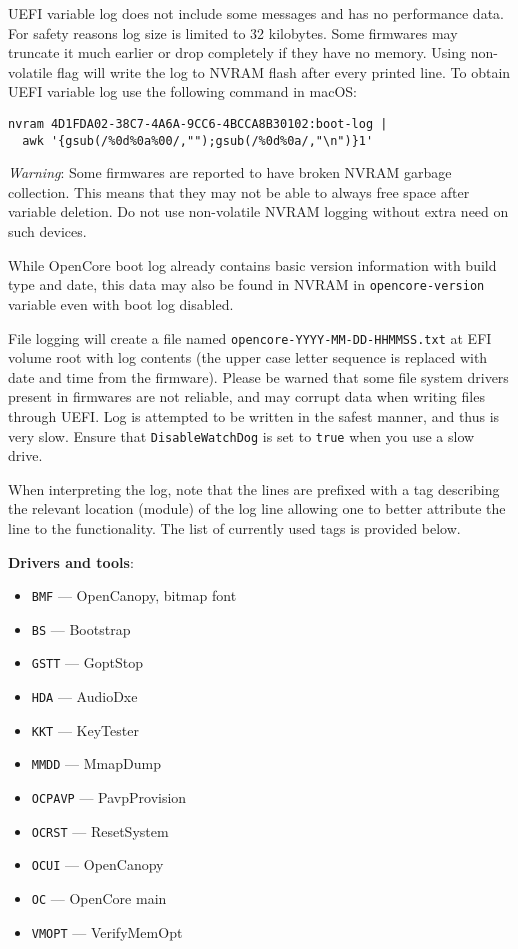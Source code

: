 \documentclass[]{article}
\providecommand{\tightlist}{%
  \setlength{\itemsep}{0pt}\setlength{\parskip}{0pt}}
\begin{document}
\begin{enumerate}
  UEFI variable log does not include some messages and has no performance data. For safety
  reasons log size is limited to 32 kilobytes. Some firmwares may truncate it much earlier
  or drop completely if they have no memory. Using non-volatile flag will write the log to
  NVRAM flash after every printed line. To obtain UEFI variable log use the following command
  in macOS:
\begin{lstlisting}[label=nvramlog, style=ocbash]
nvram 4D1FDA02-38C7-4A6A-9CC6-4BCCA8B30102:boot-log |
  awk '{gsub(/%0d%0a%00/,"");gsub(/%0d%0a/,"\n")}1'
\end{lstlisting}

  \emph{Warning}: Some firmwares are reported to have broken NVRAM garbage collection.
  This means that they may not be able to always free space after variable deletion.
  Do not use non-volatile NVRAM logging without extra need on such devices.

  While OpenCore boot log already contains basic version information with build type and
  date, this data may also be found in NVRAM in \texttt{opencore-version} variable
  even with boot log disabled.

  File logging will create a file named \texttt{opencore-YYYY-MM-DD-HHMMSS.txt} at EFI
  volume root with log contents (the upper case letter sequence is replaced with date
  and time from the firmware). Please be warned that some file system drivers present
  in firmwares are not reliable, and may corrupt data when writing files through UEFI.
  Log is attempted to be written in the safest manner, and thus is very slow. Ensure that
  \texttt{DisableWatchDog} is set to \texttt{true} when you use a slow drive.

  When interpreting the log, note that the lines are prefixed with a tag describing
  the relevant location (module) of the log line allowing one to better attribute the line
  to the functionality. The list of currently used tags is provided below.

  \textbf{Drivers and tools}:
  \begin{itemize}
  \tightlist
  \item \texttt{BMF} --- OpenCanopy, bitmap font
  \item \texttt{BS} --- Bootstrap
  \item \texttt{GSTT} --- GoptStop
  \item \texttt{HDA} --- AudioDxe
  \item \texttt{KKT} --- KeyTester
  \item \texttt{MMDD} --- MmapDump
  \item \texttt{OCPAVP} --- PavpProvision
  \item \texttt{OCRST} --- ResetSystem
  \item \texttt{OCUI} --- OpenCanopy
  \item \texttt{OC} --- OpenCore main
  \item \texttt{VMOPT} --- VerifyMemOpt
  \end{itemize}


\end{enumerate}
\end{document}
